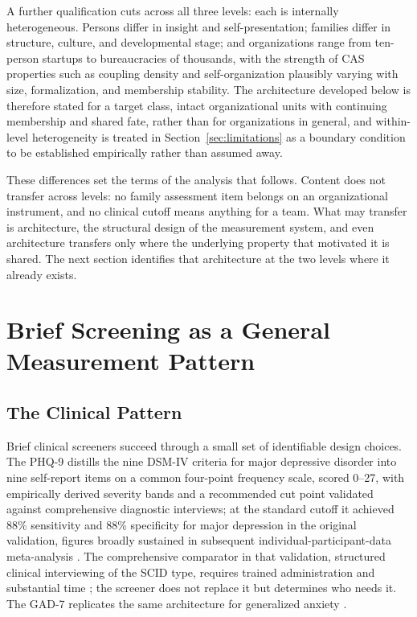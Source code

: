 \documentclass[12pt, letterpaper]{article}
\begin{document}
A further qualification cuts across all three levels: each is internally heterogeneous. Persons differ in insight and self-presentation; families differ in structure, culture, and developmental stage; and organizations range from ten-person startups to bureaucracies of thousands, with the strength of CAS properties such as coupling density and self-organization plausibly varying with size, formalization, and membership stability. The architecture developed below is therefore stated for a target class, intact organizational units with continuing membership and shared fate, rather than for organizations in general, and within-level heterogeneity is treated in Section~\ref{sec:limitations} as a boundary condition to be established empirically rather than assumed away.

These differences set the terms of the analysis that follows. Content does not transfer across levels: no family assessment item belongs on an organizational instrument, and no clinical cutoff means anything for a team. What may transfer is architecture, the structural design of the measurement system, and even architecture transfers only where the underlying property that motivated it is shared. The next section identifies that architecture at the two levels where it already exists.

\section{Brief Screening as a General Measurement Pattern}
\label{sec:screening-pattern}

\subsection{The Clinical Pattern}
\label{sec:clinical-pattern}

Brief clinical screeners succeed through a small set of identifiable design choices. The PHQ-9 distills the nine DSM-IV criteria for major depressive disorder into nine self-report items on a common four-point frequency scale, scored 0--27, with empirically derived severity bands and a recommended cut point validated against comprehensive diagnostic interviews; at the standard cutoff it achieved 88\% sensitivity and 88\% specificity for major depression in the original validation, figures broadly sustained in subsequent individual-participant-data meta-analysis \parencite{kroenke2001,negeri2021}. The comprehensive comparator in that validation, structured clinical interviewing of the SCID type, requires trained administration and substantial time \parencite{first1996}; the screener does not replace it but determines who needs it. The GAD-7 replicates the same architecture for generalized anxiety \parencite{spitzer2006}.
\end{document}
